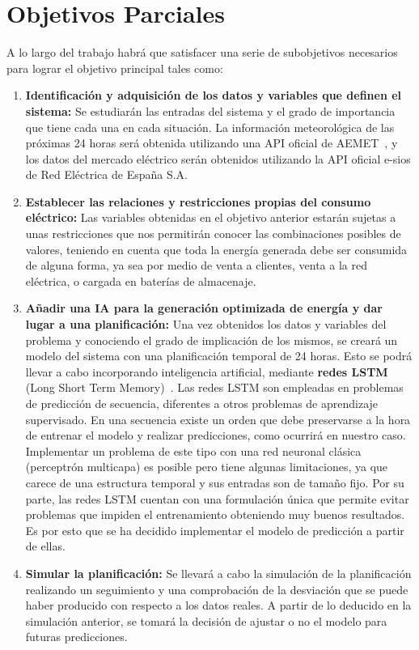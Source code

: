 \section{Objetivos Parciales}
A lo largo del trabajo habrá que satisfacer una serie de subobjetivos necesarios para lograr el objetivo principal tales como:
\begin{enumerate}
	\item \textbf{Identificación y adquisición de los datos y variables que definen el sistema:}
	Se estudiarán las entradas del sistema y el grado de importancia que tiene cada una en cada situación. La información meteorológica de las próximas 24 horas será obtenida utilizando una API oficial de AEMET~\cite{Aemet}, y los datos del mercado eléctrico serán obtenidos utilizando la API oficial e-sios de Red Eléctrica de España S.A.~\cite{Esios} 
	
	\item \textbf{Establecer las relaciones y restricciones propias del consumo eléctrico:}
	Las variables obtenidas en el objetivo anterior estarán sujetas a unas restricciones que nos permitirán conocer las combinaciones posibles de valores, teniendo en cuenta que toda la energía generada debe ser consumida de alguna forma, ya sea por medio de venta a clientes, venta a la red eléctrica, o cargada en baterías de almacenaje.
	
	\item \textbf{Añadir una IA para la generación optimizada de energía y dar lugar a una planificación:}
	Una vez obtenidos los datos y variables del problema y conociendo el grado de implicación de los mismos, se creará un modelo del sistema con una planificación temporal de 24 horas. Esto se podrá llevar a cabo incorporando inteligencia artificial, mediante \textbf{redes LSTM} (Long Short Term Memory)~\cite{Brow07}.
	Las redes LSTM son empleadas en problemas de predicción de secuencia, diferentes a otros problemas de aprendizaje supervisado. En una secuencia existe un orden que debe preservarse a la hora de entrenar el modelo y realizar predicciones, como ocurrirá en nuestro caso. Implementar un problema de este tipo con una red neuronal clásica (perceptrón multicapa) es posible pero tiene algunas limitaciones, ya que carece de una estructura temporal y sus entradas son de tamaño fijo. Por su parte, las redes LSTM cuentan con una formulación única que permite evitar problemas que impiden el entrenamiento obteniendo muy buenos resultados. Es por esto que se ha decidido implementar el modelo de predicción a partir de ellas.
	\item \textbf{Simular la planificación:}
	Se llevará a cabo la simulación de la planificación realizando un seguimiento y una comprobación de la desviación que se puede haber producido con respecto a los datos reales. A partir de lo deducido en la simulación anterior, se tomará la decisión de ajustar o no el modelo para futuras predicciones.
\end{enumerate}

